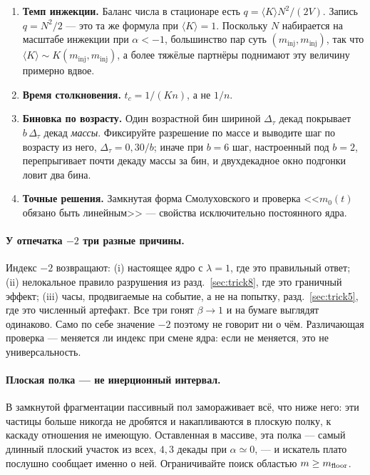 \documentclass[a4paper,12pt]{article}
\newcommand{\minj}{m_{\mathrm{inj}}}
\begin{document}
\begin{enumerate}
  \item \textbf{Темп инжекции.} Баланс числа в стационаре есть
        $q = \langle K\rangle N^2/(2V)$. Запись $q = N^2/2$ --- это та же
        формула при $\langle K\rangle = 1$. Поскольку $N$ набирается на
        масштабе инжекции при $\alpha<-1$, большинство пар суть
        $(\minj,\minj)$, так что $\langle K \rangle \sim K(\minj,\minj)$, а
        более тяжёлые партнёры поднимают эту величину примерно вдвое.
  \item \textbf{Время столкновения.} $t_c = 1/(Kn)$, а не $1/n$.
  \item \textbf{Биновка по возрасту.} Один возрастной бин шириной
        $\Delta_\tau$ декад покрывает $b\,\Delta_\tau$ декад \emph{массы}.
        Фиксируйте разрешение по массе и выводите шаг по возрасту из него,
        $\Delta_\tau = 0{,}30/b$; иначе при $b=6$ шаг, настроенный под
        $b=2$, перепрыгивает почти декаду массы за бин, и двухдекадное окно
        подгонки ловит два бина.
  \item \textbf{Точные решения.} Замкнутая форма Смолуховского и проверка
        <<$m_0(t)$ обязано быть линейным>> --- свойства исключительно
        постоянного ядра.
\end{enumerate}

\paragraph{У отпечатка $-2$ три разные причины.}
Индекс $-2$ возвращают: (i) настоящее ядро с $\lambda = 1$, где это
правильный ответ; (ii) нелокальное правило разрушения из
разд.~\ref{sec:trick8}, где это граничный эффект; (iii) часы, продвигаемые
на событие, а не на попытку, разд.~\ref{sec:trick5}, где это численный
артефакт. Все три гонят $\beta \to 1$ и на бумаге выглядят одинаково. Само
по себе значение $-2$ поэтому не говорит ни о чём. Различающая проверка ---
меняется ли индекс при смене ядра: если не меняется, это не универсальность.

\paragraph{Плоская полка --- не инерционный интервал.}
В замкнутой фрагментации пассивный пол замораживает всё, что ниже него: эти
частицы больше никогда не дробятся и накапливаются в плоскую полку, к
каскаду отношения не имеющую. Оставленная в массиве, эта полка --- самый
длинный плоский участок из всех, $4{,}3$ декады при $\alpha \simeq 0$, --- и
искатель плато послушно сообщает именно о ней. Ограничивайте поиск областью
$m \ge m_{\rm floor}$.

\end{document}
